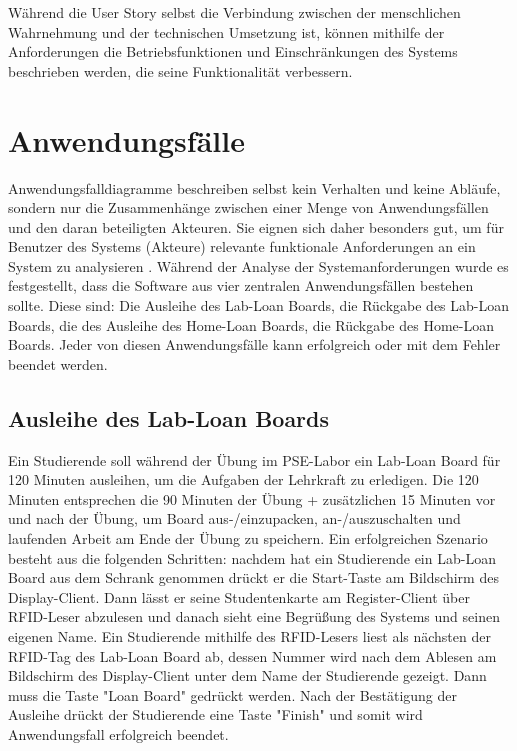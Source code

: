 Während die User Story selbst die Verbindung zwischen der menschlichen Wahrnehmung und der technischen Umsetzung ist, können mithilfe der Anforderungen die Betriebsfunktionen und Einschränkungen des Systems beschrieben werden, die seine Funktionalität verbessern.

\section{Anwendungsfälle}
\label{sec:design:use_cases}
Anwendungsfalldiagramme beschreiben selbst kein Verhalten und keine Abläufe, sondern nur die Zusammenhänge zwischen einer Menge von Anwendungsfällen und den daran beteiligten Akteuren. Sie eignen sich daher besonders gut, um für Benutzer des Systems (Akteure) relevante funktionale Anforderungen an ein System zu analysieren \cite{website:21}. Während der Analyse der Systemanforderungen wurde es festgestellt, dass die Software aus vier zentralen Anwendungsfällen bestehen sollte. Diese sind: Die Ausleihe des Lab-Loan Boards, die Rückgabe des Lab-Loan Boards, die des Ausleihe des Home-Loan Boards, die Rückgabe des Home-Loan Boards. Jeder von diesen Anwendungsfälle kann erfolgreich oder mit dem Fehler beendet werden.

\subsection{Ausleihe des Lab-Loan Boards}
\label{sec:design:use_cases:lab_loan}
Ein Studierende soll während der Übung im PSE-Labor ein Lab-Loan Board für 120 Minuten ausleihen, um die Aufgaben der Lehrkraft zu erledigen. Die 120 Minuten entsprechen die 90 Minuten der Übung + zusätzlichen 15 Minuten vor und nach der Übung, um Board aus-/einzupacken, an-/auszuschalten und laufenden Arbeit am Ende der Übung zu speichern. 
Ein erfolgreichen Szenario besteht aus die folgenden Schritten: nachdem hat ein Studierende ein Lab-Loan Board aus dem Schrank genommen drückt er die Start-Taste am Bildschirm des Display-Client. Dann lässt er seine Studentenkarte am Register-Client über RFID-Leser abzulesen und danach sieht eine Begrüßung des Systems und seinen eigenen Name. Ein Studierende mithilfe des RFID-Lesers liest als nächsten der RFID-Tag des Lab-Loan Board ab, dessen Nummer wird nach dem Ablesen am Bildschirm des Display-Client unter dem Name der Studierende gezeigt. Dann muss die Taste "Loan Board" gedrückt werden. Nach der Bestätigung der Ausleihe drückt der Studierende eine Taste "Finish" und somit wird Anwendungsfall erfolgreich beendet. 

